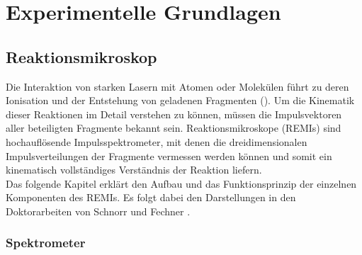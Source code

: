 \chapter{Experimentelle Grundlagen} 
%
%
%
%
\section{Reaktionsmikroskop}

Die Interaktion von starken Lasern mit Atomen oder Molekülen führt zu deren Ionisation und der Entstehung von geladenen Fragmenten (\cite{hertel2011}). Um die Kinematik dieser Reaktionen im Detail verstehen zu können, müssen die Impulsvektoren aller beteiligten Fragmente bekannt sein. Reaktionsmikroskope (REMIs) sind hochauflösende Impulsspektrometer, mit denen die dreidimensionalen Impulsverteilungen der Fragmente vermessen werden können und somit ein kinematisch vollständiges Verständnis der Reaktion liefern. \\
Das folgende Kapitel erklärt den Aufbau und das Funktionsprinzip der einzelnen Komponenten des REMIs. Es folgt dabei den Darstellungen in den Doktorarbeiten von Schnorr \cite{Schn14} und Fechner \cite{Fech14}. %


\subsection{Spektrometer} \label{sec:Spektrometer} 

